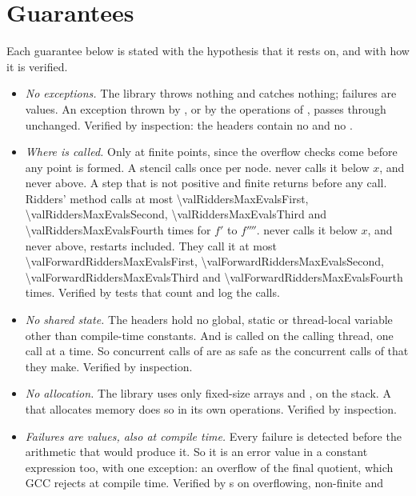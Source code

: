 \section{Guarantees}\label{sec:guarantees-guarantees}

Each guarantee below is stated with the hypothesis that it rests on, and with how it is verified.
\begin{itemize}
  \item \emph{No exceptions.} The library throws nothing and catches nothing; failures are 
    values. An exception thrown by , or by the operations of , passes through unchanged. Verified by
    inspection: the headers contain no  and no .
  \item \emph{Where  is called.} Only at finite points, since the overflow checks come before any point is
    formed. A stencil calls  once per node.  never calls it below $x$, and
     never above. A step that is not positive and finite returns  before any call.
    Ridders' method calls  at most \num{\valRiddersMaxEvalsFirst}, \num{\valRiddersMaxEvalsSecond},
    \num{\valRiddersMaxEvalsThird} and \num{\valRiddersMaxEvalsFourth} times for $f'$ to $f''''$.
     never calls it below $x$, and  never above, restarts included. They
    call it at most \num{\valForwardRiddersMaxEvalsFirst}, \num{\valForwardRiddersMaxEvalsSecond},
    \num{\valForwardRiddersMaxEvalsThird} and \num{\valForwardRiddersMaxEvalsFourth} times. Verified by tests that
    count and log the calls.
  \item \emph{No shared state.} The headers hold no global, static or thread-local variable other than compile-time
    constants. And  is called on the calling thread, one call at a time. So concurrent calls of
     are as safe as the concurrent calls of  that they make. Verified by inspection.
  \item \emph{No allocation.} The library uses only fixed-size arrays and , on the stack. A
     that allocates memory does so in its own operations. Verified by inspection.
  \item \emph{Failures are values, also at compile time.} Every failure is detected before the arithmetic that would
    produce it. So it is an error value in a constant expression too, with one exception: an overflow of the final
    quotient, which GCC rejects at compile time. Verified by s on overflowing, non-finite and

\end{itemize}
